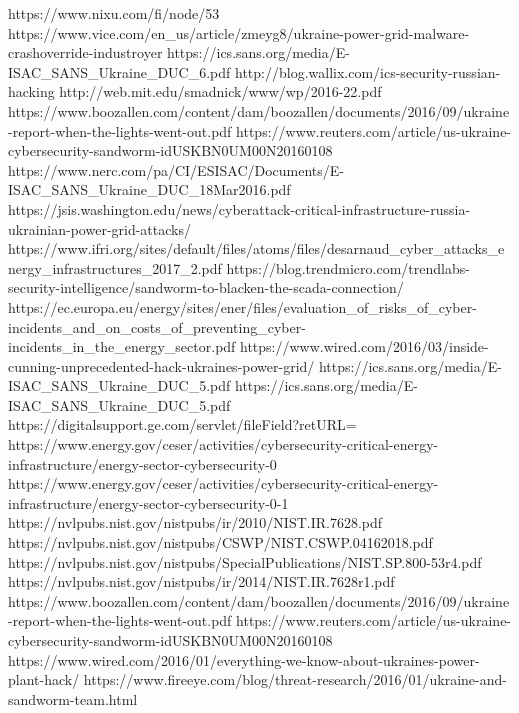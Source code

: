 https://www.nixu.com/fi/node/53
https://www.vice.com/en_us/article/zmeyg8/ukraine-power-grid-malware-crashoverride-industroyer
https://ics.sans.org/media/E-ISAC_SANS_Ukraine_DUC_6.pdf
http://blog.wallix.com/ics-security-russian-hacking
http://web.mit.edu/smadnick/www/wp/2016-22.pdf
https://www.boozallen.com/content/dam/boozallen/documents/2016/09/ukraine-report-when-the-lights-went-out.pdf
https://www.reuters.com/article/us-ukraine-cybersecurity-sandworm-idUSKBN0UM00N20160108
https://www.nerc.com/pa/CI/ESISAC/Documents/E-ISAC_SANS_Ukraine_DUC_18Mar2016.pdf
https://jsis.washington.edu/news/cyberattack-critical-infrastructure-russia-ukrainian-power-grid-attacks/
https://www.ifri.org/sites/default/files/atoms/files/desarnaud_cyber_attacks_energy_infrastructures_2017_2.pdf
https://blog.trendmicro.com/trendlabs-security-intelligence/sandworm-to-blacken-the-scada-connection/
https://ec.europa.eu/energy/sites/ener/files/evaluation_of_risks_of_cyber-incidents_and_on_costs_of_preventing_cyber-incidents_in_the_energy_sector.pdf
https://www.wired.com/2016/03/inside-cunning-unprecedented-hack-ukraines-power-grid/
https://ics.sans.org/media/E-ISAC_SANS_Ukraine_DUC_5.pdf
https://ics.sans.org/media/E-ISAC_SANS_Ukraine_DUC_5.pdf
https://digitalsupport.ge.com/servlet/fileField?retURL=%
https://www.energy.gov/ceser/activities/cybersecurity-critical-energy-infrastructure/energy-sector-cybersecurity-0
https://www.energy.gov/ceser/activities/cybersecurity-critical-energy-infrastructure/energy-sector-cybersecurity-0-1
https://nvlpubs.nist.gov/nistpubs/ir/2010/NIST.IR.7628.pdf
https://nvlpubs.nist.gov/nistpubs/CSWP/NIST.CSWP.04162018.pdf
https://nvlpubs.nist.gov/nistpubs/SpecialPublications/NIST.SP.800-53r4.pdf
https://nvlpubs.nist.gov/nistpubs/ir/2014/NIST.IR.7628r1.pdf
https://www.boozallen.com/content/dam/boozallen/documents/2016/09/ukraine-report-when-the-lights-went-out.pdf
https://www.reuters.com/article/us-ukraine-cybersecurity-sandworm-idUSKBN0UM00N20160108
https://www.wired.com/2016/01/everything-we-know-about-ukraines-power-plant-hack/
https://www.fireeye.com/blog/threat-research/2016/01/ukraine-and-sandworm-team.html


